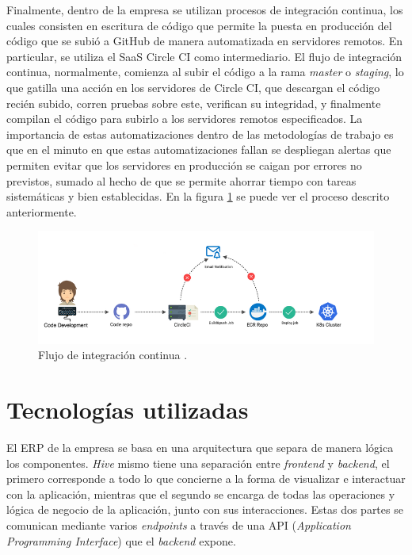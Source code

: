     Finalmente, dentro de la empresa se utilizan procesos de integración continua, los cuales consisten en escritura de código que permite la puesta en producción del código que se subió a GitHub de manera automatizada en servidores remotos. En particular, se utiliza el SaaS Circle CI como intermediario. El flujo de integración continua, normalmente, comienza al subir el código a la rama \textit{master} o \textit{staging}, lo que gatilla una acción en los servidores de Circle CI, que descargan el código recién subido, corren pruebas sobre este, verifican su integridad, y finalmente compilan el código para subirlo a los servidores remotos especificados. La importancia de estas automatizaciones dentro de las metodologías de trabajo es que en el minuto en que estas automatizaciones fallan se despliegan alertas que permiten evitar que los servidores en producción se caigan por errores no previstos, sumado al hecho de que se permite ahorrar tiempo con tareas sistemáticas y bien establecidas. En la figura \ref{fig:continuous_integration} se puede ver el proceso descrito anteriormente.
    
    \begin{figure}
        \centering
        \includegraphics[width=0.9\linewidth]{figures/continuous_integration.png}
        \caption{Flujo de integración continua \protect\cite{continuous_integration}.}
        \label{fig:continuous_integration}
    \end{figure}

\section{Tecnologías utilizadas}

    El ERP de la empresa se basa en una arquitectura que separa de manera lógica los componentes. \textit{Hive} mismo tiene una separación entre \textit{frontend} y \textit{backend}, el primero corresponde a todo lo que concierne a la forma de visualizar e interactuar con la aplicación, mientras que el segundo se encarga de todas las operaciones y lógica de negocio de la aplicación, junto con sus interacciones. Estas dos partes se comunican mediante varios \textit{endpoints} a través de una API (\textit{Application Programming Interface}) que el \textit{backend} expone. 
    
